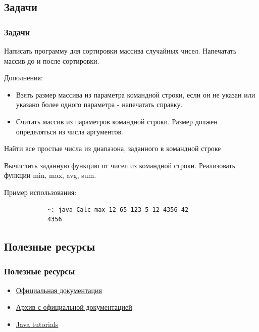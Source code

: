 \subsection{Задачи}
\begin{frame}[fragile]
	\frametitle{Задачи}

	\begin{enumerate}
		\begin{item}
			Написать программу для сортировки массива случайных чисел. Напечатать массив до и после сортировки.

			Дополнения:
			\begin{itemize}
				\item{Взять размер массива из параметра командной строки, если он не указан или указано более одного параметра - напечатать справку.}
				\item{Считать массив из параметров командной строки. Размер должен определяться из числа аргументов.}
			\end{itemize}
		\end{item}
		\begin{item}
			Найти все простые числа из диапазона, заданного в командной строке 
		\end{item}
		\begin{item}
			Вычислить заданную функцию от чисел из командной строки. Реализовать функции min, max, avg, sum.


			Пример использования:
			\begin{verbatim}
			~: java Calc max 12 65 123 5 12 4356 42
			4356
			\end{verbatim}

		\end{item}

	\end{enumerate}
\end{frame}

\subsection{Полезные ресурсы}
\begin{frame}
	\frametitle{Полезные ресурсы}

	\begin{itemize}
	\item{\href{http://docs.oracle.com/javase/6/docs/}{Официальная документация}}
	\item{\href{http://www.oracle.com/technetwork/java/javase/documentation/java-se-7-doc-download-435117.html}{Архив с официальной документацией}}
	\item{\href{http://docs.oracle.com/javase/tutorial/}{Java tutorials}}
	\end{itemize}
\end{frame}

